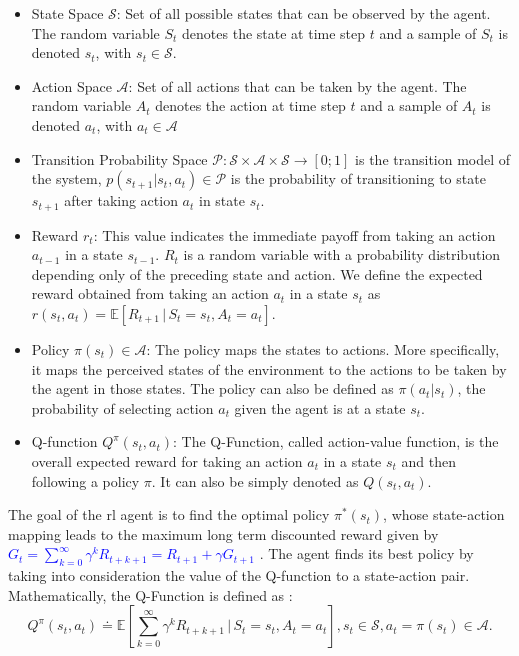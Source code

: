 \begin{itemize}
  \item State Space $\mathcal{S}$: Set of all possible states that can be observed by the agent. The random variable $S_t$ denotes the state at time step $t$ and a sample of $S_t$ is denoted $s_t$, with $s_t \in \mathcal{S}$.
  \item Action Space $\mathcal{A}$: Set of all actions that can be taken by the agent. The random variable $A_t$ denotes the action at time step $t$ and a sample of $A_t$ is denoted $a_t$, with $a_t \in \mathcal{A}$
  \item Transition Probability Space $\mathcal{P}: \mathcal{S} \times \mathcal{A} \times \mathcal{S} \rightarrow [0;1]$ is the transition model of the system, $p(s_{t+1} | s_t,a_t) \in \mathcal{P}$ is the probability of transitioning to state $s_{t+1}$ after taking action $a_t$ in state $s_t$.
  \item Reward  $r_t$: This value indicates the immediate payoff from taking an action $a_{t-1}$ in a state $s_{t-1}$. $R_t$ is a random variable with a probability distribution depending only of the preceding state and action. We define the expected reward obtained from taking an action $a_t$ in a state $s_t$ as $r(s_t,a_t) = \mathbb{E}\left[R_{t+1} \, | \, S_t = s_t, A_t = a_t \right] $.
  \item Policy $\pi(s_t) \in \mathcal{A} $: The policy maps the states to actions. More specifically, it maps the perceived states of the environment to the actions to be taken by the agent in those states. The policy can also be defined as $\pi(a_t | s_t)$, the probability of selecting action $a_t$ given the agent is at a state $s_t$.
  \item Q-function $Q^{\pi}(s_t,a_t)$:  The Q-Function, called action-value function, is the overall expected reward for taking an action $a_t$ in a state $s_t$ and then following a policy $\pi$. It can also be simply denoted as $Q(s_t,a_t)$.
\end{itemize}


The goal of the \gls{rl} agent is to find the optimal policy $\pi^{*}(s_t)$, whose state-action mapping leads to the maximum long term discounted reward given by \textcolor{blue}{$G_t = \sum_{k=0}^{\infty} \gamma^{k} R_{t+k+1} = R_{t+1} + \gamma G_{t+1} $} \cite{kaelbling1996reinforcement}.
%
The agent finds its best policy by taking into consideration the value of the Q-function to a state-action pair.
%
Mathematically, the Q-Function is defined as \cite{2010Szepesvari}:
\begin{equation} \label{eq.:eqQvalue}
  Q^{\pi}(s_t, a_t) \doteq \mathbb{E}\left[\sum_{k=0}^{\infty} \gamma^{k} R_{t+k+1} \, | \, S_t = s_t, A_t = a_t \right], s_t \in \mathcal{S}, a_t = \pi (s_t) \in \mathcal{A}.
\end{equation}



